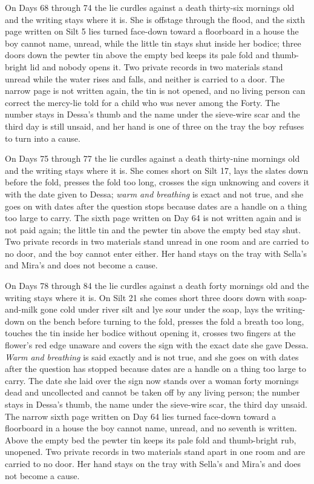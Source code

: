 \documentclass{design/chronicle}
\begin{document}
{On Days 68 through 74 the lie curdles against a death thirty-six mornings old and the writing stays where it is. She is offstage through the flood, and the sixth page written on Silt 5 lies turned face-down toward a floorboard in a house the boy cannot name, unread, while the little tin stays shut inside her bodice; three doors down the pewter tin above the empty bed keeps its pale fold and thumb-bright lid and nobody opens it. Two private records in two materials stand unread while the water rises and falls, and neither is carried to a door. The narrow page is not written again, the tin is not opened, and no living person can correct the mercy-lie told for a child who was never among the Forty. The number stays in Dessa’s thumb and the name under the sieve-wire scar and the third day is still unsaid, and her hand is one of three on the tray the boy refuses to turn into a cause.

On Days 75 through 77 the lie curdles against a death thirty-nine mornings old and the writing stays where it is. She comes short on Silt 17, lays the slates down before the fold, presses the fold too long, crosses the sign unknowing and covers it with the date given to Dessa; \emph{warm and breathing} is exact and not true, and she goes on with dates after the question stops because dates are a handle on a thing too large to carry. The sixth page written on Day 64 is not written again and is not paid again; the little tin and the pewter tin above the empty bed stay shut. Two private records in two materials stand unread in one room and are carried to no door, and the boy cannot enter either. Her hand stays on the tray with Sella’s and Mira’s and does not become a cause.

On Days 78 through 84 the lie curdles against a death forty mornings old and the writing stays where it is. On Silt 21 she comes short three doors down with soap-and-milk gone cold under river silt and lye sour under the soap, lays the writing-down on the bench before turning to the fold, presses the fold a breath too long, touches the tin inside her bodice without opening it, crosses two fingers at the flower’s red edge unaware and covers the sign with the exact date she gave Dessa. \emph{Warm and breathing} is said exactly and is not true, and she goes on with dates after the question has stopped because dates are a handle on a thing too large to carry. The date she laid over the sign now stands over a woman forty mornings dead and uncollected and cannot be taken off by any living person; the number stays in Dessa’s thumb, the name under the sieve-wire scar, the third day unsaid. The narrow sixth page written on Day 64 lies turned face-down toward a floorboard in a house the boy cannot name, unread, and no seventh is written. Above the empty bed the pewter tin keeps its pale fold and thumb-bright rub, unopened. Two private records in two materials stand apart in one room and are carried to no door. Her hand stays on the tray with Sella’s and Mira’s and does not become a cause.

}
\end{document}
